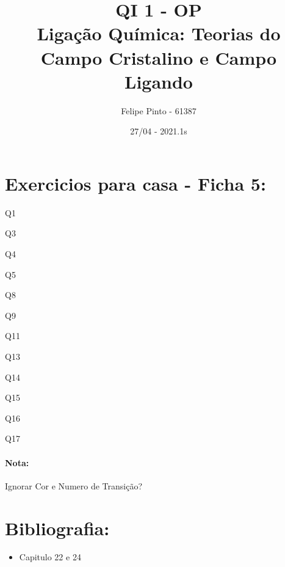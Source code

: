 \documentclass[12pt]{article}
\begin{document}
\title{\bfseries\color{DarkGreen!75!}%
	QI 1 - OP\\
	Ligação Química: 
	Teorias do Campo Cristalino e Campo Ligando%
}
\author{Felipe Pinto - 61387}
\date{27/04 - 2021.1s}

\maketitle
\tableofcontents
\break

\section{Exercicios para casa - Ficha 5:}
\begin{itemize}
\begin{multicols}{4}

	\item Q1
	\item Q3
	\item Q4
	\item Q5
	\item Q8
	\item Q9
	\item Q11
	\item Q13
	\item Q14
	\item Q15
	\item Q16
	\item Q17

\end{multicols}	
\end{itemize}

\paragraph{Nota:}
Ignorar Cor e Numero de Transição?

\section{Bibliografia:}
\begin{itemize}
	\item Capitulo 22 e 24
\end{itemize}
\end{document}
